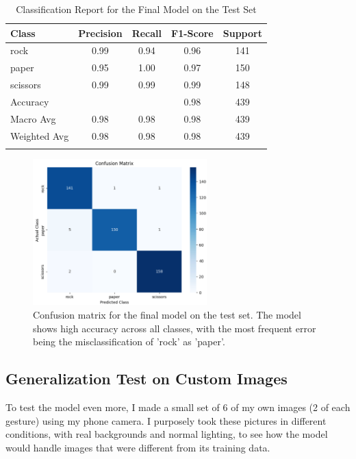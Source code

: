 \documentclass[pdflatex,sn-mathphys-num]{sn-jnl}%
\theoremstyle{thmstyleone}%
\theoremstyle{thmstyletwo}%
\theoremstyle{thmstylethree}%
\begin{document}
\begin{table}[htbp]
\caption{Classification Report for the Final Model on the Test Set}\label{tab:report}%
\begin{tabular}{@{}lcccc@{}}
\toprule
Class & Precision & Recall & F1-Score & Support \\
\midrule
rock     & 0.99 & 0.94 & 0.96 & 141 \\
paper    & 0.95 & 1.00 & 0.97 & 150 \\
scissors & 0.99 & 0.99 & 0.99 & 148 \\
\midrule
Accuracy &      &      & 0.98 & 439 \\
Macro Avg & 0.98 & 0.98 & 0.98 & 439 \\
Weighted Avg & 0.98 & 0.98 & 0.98 & 439 \\
\botrule
\end{tabular}
\end{table}

\begin{figure}[htbp]
\centering
\includegraphics[width=0.6\textwidth]{confusion_matrix.png}
\caption{Confusion matrix for the final model on the test set. The model shows high accuracy across all classes, with the most frequent error being the misclassification of 'rock' as 'paper'.}\label{fig:cm}
\end{figure}

\subsection{Generalization Test on Custom Images}
To test the model even more, I made a small set of 6 of my own images (2 of each gesture) using my phone camera. I purposely took these pictures in different conditions, with real backgrounds and normal lighting, to see how the model would handle images that were different from its training data.
\end{document}
